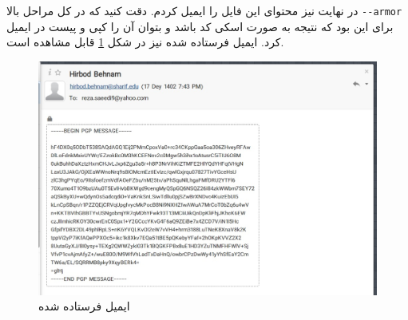\documentclass[]{article}
\begin{document}
در نهایت نیز محتوای این فایل را ایمیل کردم. دقت کنید که در کل مراحل بالا
\verb|--armor|
برای این بود که نتیجه به صورت اسکی کد باشد و بتوان آن را کپی و پیست در ایمیل کرد.
ایمیل فرستاده شده نیز در شکل
\ref{fig:gpg:email}
قابل مشاهده است.
\begin{figure}[H]
    \centering
    \includegraphics[scale=0.35]{pics/gpg-email.jpg}
    \caption{ایمیل فرستاده شده}
    \label{fig:gpg:email}
\end{figure}
\section{}
\section{}
\section{}
\end{document}
